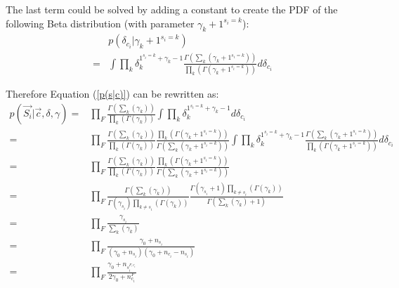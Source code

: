 \documentclass[../main.tex]{subfiles}
\begin{document}
\noindent The last term could be solved by adding a constant to create the PDF of the following Beta distribution (with parameter $\gamma_{k}+1^{s_{i}=k} $):
\begin{equation}
\begin{split}
&p(\delta_{c_{i}}|\gamma_{k}+1^{s_{i}=k})\\
=&\int \prod_{k}\delta_{k}^{1^{s_{i}=k}+\gamma_{k}-1}%
\frac{\Gamma(\sum_{k}(\gamma_{k}+1^{s_{i}=k}))}{\prod_{k}(\Gamma(\gamma_{k}+1^{s_{i}=k}))}%
d\delta_{c_{i}}
\end{split}
\end{equation}


Therefore Equation (\ref{p(s|c)}) can be rewritten as:
\begin{equation}
\begin{split}
p(\vec{S_{i}}| \vec{c}, \delta, \gamma)
= & \prod_{F} \frac{\Gamma(\sum_{k}(\gamma_{k}))}{\prod_{k}(\Gamma(\gamma_{k}))}%
\int \prod_{k}\delta_{k}^{1^{s_{i}=k}+\gamma_{k}-1}d\delta_{c_{i}}\\
=&\prod_{F} \frac{\Gamma(\sum_{k}(\gamma_{k}))}{\prod_{k}(\Gamma(\gamma_{k}))}%
\frac{\prod_{k}(\Gamma(\gamma_{k}+1^{s_{i}=k}))}{\Gamma(\sum_{k}(\gamma_{k}+1^{s_{i}=k}))} %
\int \prod_{k}\delta_{k}^{1^{s_{i}=k}+\gamma_{k}-1}
\frac{\Gamma(\sum_{k}(\gamma_{k}+1^{s_{i}=k}))}{\prod_{k}(\Gamma(\gamma_{k}+1^{s_{i}=k}))}%
d\delta_{c_{i}}\\
=&\prod_{F} \frac{\Gamma(\sum_{k}(\gamma_{k}))}{\prod_{k}(\Gamma(\gamma_{k}))}%
\frac{\prod_{k}(\Gamma(\gamma_{k}+1^{s_{i}=k}))}{\Gamma(\sum_{k}(\gamma_{k}+1^{s_{i}=k}))}\\ %
=&\prod_{F}\frac{\Gamma(\sum_{k}(\gamma_{k}))}{\Gamma(\gamma_{s_{i}})\prod_{k\neq s_{i}}(\Gamma(\gamma_{k}))}%
\frac{\Gamma(\gamma_{s_{i}}+1)\prod_{k\neq s_{i}}(\Gamma(\gamma_{k}))}{\Gamma(\sum_{k}(\gamma_{k})+1)}\\%
=&\prod_{F}\frac{\gamma_{s_{i}}}{\sum_{k}(\gamma_{k})}\\%
=&\prod_{F}\frac{\gamma_{0}+n_{s_{i}}}{(\gamma_{0}+n_{s_{i}})(\gamma_{0}+n_{c_{i}}-n_{s_{i}})}\\%
=& \prod_{F}\frac{\gamma_{0}+n_{s^{F, c_{i}}_{i}}}{2\gamma_{0}+n^{F}_{c_{i}}}
\end{split}
\end{equation}

\begin{comment}
Similarly for L:
\begin{equation}
\begin{split}
p(l_{i} |\vec{c},\lambda, \eta) &= \frac{\eta_{l_{i}}}{\sum_{k}{\eta_{k}}}\\
&= \frac{\eta_{0}+n_{l_{i}}^{c_{i}}}{2\eta_{0}+n_{c_{i}}}
\end{split}
\end{equation}
\end{comment}
\end{document}
